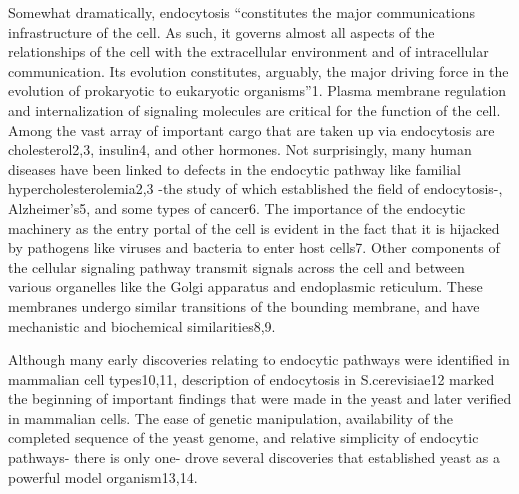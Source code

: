 \vspace{5mm}
Somewhat dramatically, endocytosis “constitutes the major communications infrastructure of the cell. As such, it governs almost all aspects of the relationships of the cell with the extracellular environment and of intracellular communication. Its evolution constitutes, arguably, the major driving force in the evolution of prokaryotic to eukaryotic organisms”1.  Plasma membrane regulation and internalization of signaling molecules are critical for the function of the cell. Among the vast array of important cargo that are taken up via endocytosis are cholesterol2,3, insulin4, and other hormones. Not surprisingly, many human diseases have been linked to defects in the endocytic pathway like familial hypercholesterolemia2,3 -the study of which established the field of endocytosis-, Alzheimer’s5, and some types of cancer6. The importance of the endocytic machinery as the entry portal of the cell is evident in the fact that it is hijacked by pathogens like viruses and bacteria to enter host cells7. Other components of the cellular signaling pathway transmit signals across the cell and between various organelles like the Golgi apparatus and endoplasmic reticulum. These membranes undergo similar transitions of the bounding membrane, and have mechanistic and biochemical similarities8,9. 




Although many early discoveries relating to endocytic pathways were identified in mammalian cell types10,11, description of endocytosis in S.cerevisiae12 marked the beginning of important findings that were made in the yeast and later verified in mammalian cells. The ease of genetic manipulation, availability of the completed sequence of the yeast genome, and relative simplicity of endocytic pathways- there is only one- drove several discoveries that established yeast as a powerful model organism13,14.



